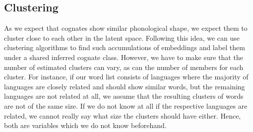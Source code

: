 \documentclass[6pt]{article}
\begin{document}
%

\subsection{Clustering}
\label{Clustering}
As we expect that cognates show similar phonological shape, we expect them to cluster close to each other in the latent space. Following this idea, we can use clustering algorithms to find such accumulations of embeddings and label them under a shared inferred cognate class. However, we have to make sure that the number of estimated clusters can vary, as can the number of members for each cluster. For instance, if our word list consists of languages where the majority of languages are closely related and should show similar words, but the remaining languages are not related at all, we assume that the resulting clusters of words are not of the same size. If we do not know at all if the respective languages are related, we cannot really say what size the clusters should have either. Hence, both are variables which we do not know beforehand. 
\end{document}
